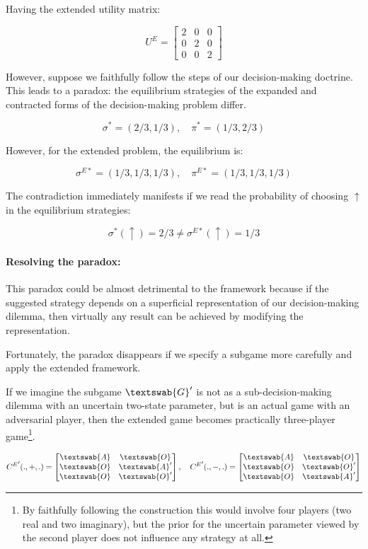 \documentclass{article}
\begin{document}
Having the extended utility matrix:

\[
U^E=
\begin{bmatrix}
2 & 0 & 0 \\
0 & 2 & 0 \\
0 & 0 & 2 
\end{bmatrix}
\]

However, suppose we faithfully follow the steps of our decision-making doctrine. 
This leads to a paradox: the equilibrium strategies of the expanded and contracted forms of the decision-making problem differ.

\[
\sigma^*=(2/3,1/3), \quad
\pi^*=(1/3,2/3)
\]

However, for the extended problem, the equilibrium is:

\[
\sigma^{E*}=(1/3,1/3,1/3), \quad
\pi^{E*}=(1/3,1/3,1/3)
\]

The contradiction immediately manifests if we read the probability of choosing $\uparrow$ in the equilibrium strategies:

\[
\sigma^*(\uparrow) = 2/3 \neq \sigma^{E*}(\uparrow) = 1/3
\]

\paragraph{Resolving the paradox:}
This paradox could be almost detrimental to the framework because if the suggested strategy depends on a superficial representation of our decision-making dilemma, then virtually any result can be achieved by modifying the representation.

Fortunately, the paradox disappears if we specify a subgame more carefully and apply the extended framework.

If we imagine the subgame $\textswab{G}'$ is not as a sub-decision-making dilemma with an uncertain two-state parameter, but is an actual game with an adversarial player, then the extended game becomes practically three-player game\footnote{By faithfully following the construction this would involve four players (two real and two imaginary), but the prior for the uncertain parameter viewed by the second player does not influence any strategy at all.}.


\[
{C^E}'(.,+,.)=
\begin{bmatrix}
\textswab{A} & \textswab{O} \\
\textswab{O} & \textswab{A}' \\
\textswab{O} & \textswab{O}'
\end{bmatrix}, \quad
{C^E}'(.,-,.)=
\begin{bmatrix}
\textswab{A} & \textswab{O} \\
\textswab{O} & \textswab{O}' \\
\textswab{O} & \textswab{A}'
\end{bmatrix}
\]
\end{document}
